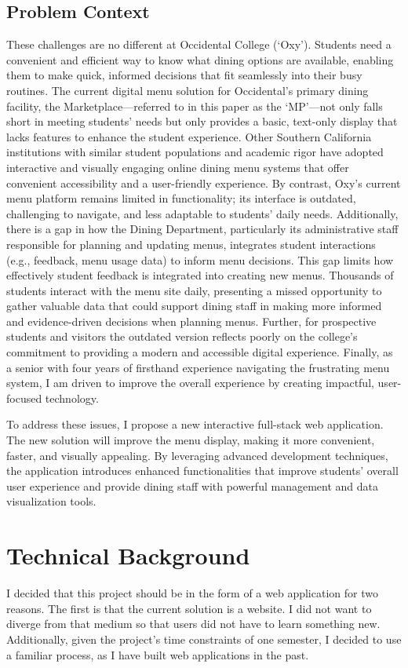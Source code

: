\documentclass[10pt,twocolumn]{article}
\begin{document}
\subsection{Problem Context}
These challenges are no different at Occidental College (‘Oxy’). Students need a convenient and efficient way to know what dining options are available, enabling them to make quick, informed decisions that fit seamlessly into their busy routines. The current digital menu solution for Occidental’s primary dining facility, the Marketplace—referred to in this paper as the ‘MP’—not only falls short in meeting students’ needs but only provides a basic, text-only display that lacks features to enhance the student experience. Other Southern California institutions with similar student populations and academic rigor have adopted interactive and visually engaging online dining menu systems that offer convenient accessibility and a user-friendly experience. By contrast, Oxy’s current menu platform remains limited in functionality; its interface is outdated, challenging to navigate, and less adaptable to students' daily needs. Additionally, there is a gap in how the Dining Department, particularly its administrative staff responsible for planning and updating menus, integrates student interactions (e.g., feedback, menu usage data) to inform menu decisions. This gap limits how effectively student feedback is integrated into creating new menus. Thousands of students interact with the menu site daily, presenting a missed opportunity to gather valuable data that could support dining staff in making more informed and evidence-driven decisions when planning menus. Further, for prospective students and visitors the outdated version reflects poorly on the college's commitment to providing a modern and accessible digital experience. Finally, as a senior with four years of firsthand experience navigating the frustrating menu system, I am driven to improve the overall experience by creating impactful, user-focused technology.

To address these issues, I propose a new interactive full-stack web application. The new solution will improve the menu display, making it more convenient, faster, and visually appealing. By leveraging advanced development techniques, the application introduces enhanced functionalities that improve students' overall user experience and provide dining staff with powerful management and data visualization tools.


\section{Technical Background}
I decided that this project should be in the form of a web application for two reasons. The first is that the current solution is a website. I did not want to diverge from that medium so that users did not have to learn something new. Additionally, given the project's time constraints of one semester, I decided to use a familiar process, as I have built web applications in the past.
\end{document}
